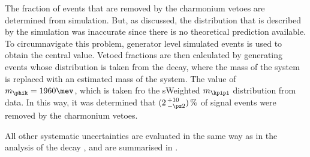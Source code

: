 The fraction of events that are removed by the charmonium vetoes are determined from simulation.
But, as discussed, the \qsq distribution that is described by the \btophikmumu simulation was
inaccurate since there is no theoretical prediction available.
To circumnavigate this problem, generator level simulated events is used to obtain the central
value.
Vetoed fractions are then calculated by generating events whose \qsq distribution is taken from the
 decay, where the mass of the  system is replaced with an
estimated mass of the \phik system.
The value of $m_{\phik}=1960\mev$, which is taken fro the sWeighted $m_{\kpipi}$ distribution from
data.
In this way, it was determined that $(2\,^{+10}_{-\pz2})\,\%$ of signal events were removed by the
charmonium vetoes.

All other systematic uncertainties are evaluated in the same way as in the analysis of the decay
\btokpipimumu, and are summarised in .


